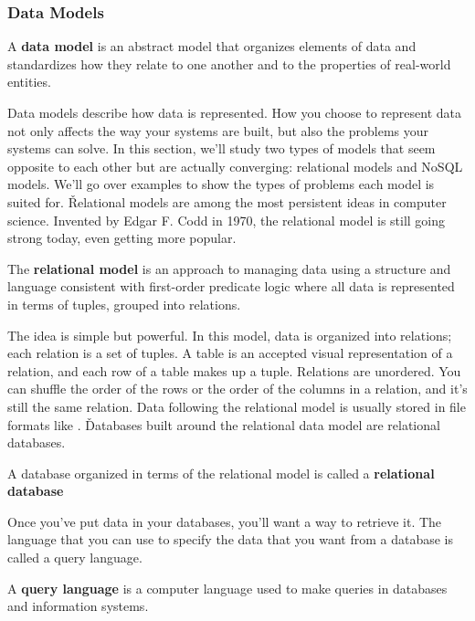 
\subsubsection{Data Models}

A \textbf{data model} is an abstract model that organizes elements of data and standardizes how they relate to one
another and to the properties of real-world entities.
\ed

Data models describe how data is represented. How you choose to represent data not only affects the way your systems
are built, but also the problems your systems can solve. In this section, we'll study two types of models that seem
opposite to each other but are actually converging: relational models and NoSQL models. We'll go over examples to
show the types of problems each model is suited for. \v

Relational models are among the most persistent ideas in computer science. Invented by Edgar F. Codd in 1970, the
relational model is still going strong today, even getting more popular.

The \textbf{relational model} is an approach to managing data using a structure and language consistent with first-order
predicate logic where all data is represented in terms of tuples, grouped into relations.
\ed

The idea is simple but powerful. In this model, data is organized into relations; each relation is a set of tuples. A
table is an accepted visual representation of a relation, and each row of a table makes up a tuple. Relations are
unordered. You can shuffle the order of the rows or the order of the columns in a relation, and it's still the same
relation. Data following the relational model is usually stored in file formats like . \v

Databases built around the relational data model are relational databases.

A database organized in terms of the relational model is called a \textbf{relational database}
\ed

Once you've put data in your databases, you'll want a way to retrieve it. The language that you can use to specify
the data that you want from a database is called a query language.

A \textbf{query language} is a computer language used to make queries in databases and information systems.
\ed

